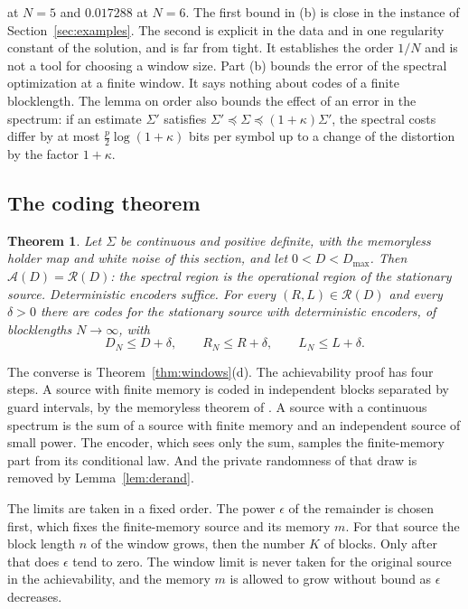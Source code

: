\documentclass[11pt,onecolumn]{IEEEtran}
\newtheorem{theorem}{Theorem}
\begin{document}
at $N=5$ and $0.017288$ at $N=6$. The first bound in (b) is close in the
instance of Section~\ref{sec:examples}. The second is explicit in the
data and in one regularity constant of the solution, and is far from
tight. It establishes the order $1/N$ and is not a tool for choosing a
window size. Part (b) bounds the error of the spectral optimization at a
finite window. It says nothing about codes of a finite blocklength.
The lemma on order also bounds the effect of an error in the spectrum:
if an estimate $\Sigma'$ satisfies
$\Sigma'\preceq\Sigma\preceq(1+\kappa)\Sigma'$, the spectral costs differ
by at most $\tfrac p2\log(1+\kappa)$ bits per symbol up to a change of
the distortion by the factor $1+\kappa$.

\subsection{The coding theorem}

\begin{theorem}\label{thm:achieve}
Let $\Sigma$ be continuous and positive definite, with the memoryless
holder map and white noise of this section, and let $0<D<D_{\max}$.
Then $\mathcal A(D)=\mathcal R(D)$: the spectral region is the
operational region of the stationary source. Deterministic encoders
suffice. For every $(R,L)\in\mathcal R(D)$ and every $\delta>0$ there
are codes for the stationary source with deterministic encoders, of
blocklengths $N\to\infty$, with
\[
D_N\le D+\delta,\qquad R_N\le R+\delta,\qquad L_N\le L+\delta .
\]
\end{theorem}

The converse is Theorem~\ref{thm:windows}(d). The achievability proof
has four steps. A source with finite memory is coded in
independent blocks separated by guard intervals, by the memoryless
theorem of \cite{part1}. A source with a continuous spectrum is the sum
of a source with finite memory and an independent source of small
power. The encoder, which sees only the sum, samples the finite-memory
part from its conditional law. And the private randomness of that draw
is removed by Lemma~\ref{lem:derand}.

The limits are taken in a fixed order. The power $\epsilon$ of the
remainder is chosen first, which fixes the finite-memory source and its
memory $m$. For that source the block length $n$ of the window grows,
then the number $K$ of blocks. Only after that does $\epsilon$ tend to
zero. The window limit is never taken for the original source in the
achievability, and the memory $m$ is allowed to grow without bound as
$\epsilon$ decreases.
\end{document}
